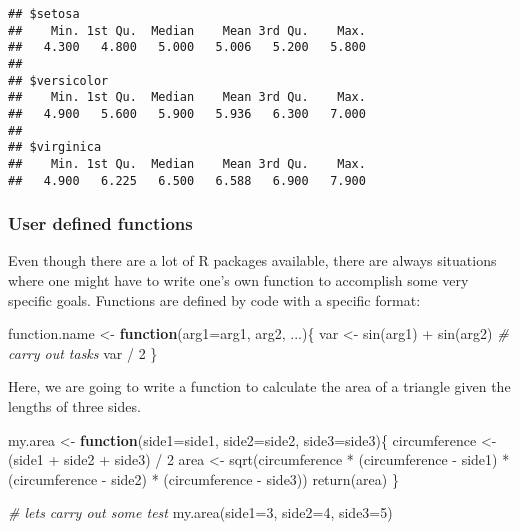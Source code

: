 \documentclass[
]{article}
\newenvironment{Shaded}{\begin{snugshade}}{\end{snugshade}}
\newcommand{\AttributeTok}[1]{\textcolor[rgb]{0.77,0.63,0.00}{#1}}
\newcommand{\CommentTok}[1]{\textcolor[rgb]{0.56,0.35,0.01}{\textit{#1}}}
\newcommand{\ControlFlowTok}[1]{\textcolor[rgb]{0.13,0.29,0.53}{\textbf{#1}}}
\newcommand{\DecValTok}[1]{\textcolor[rgb]{0.00,0.00,0.81}{#1}}
\newcommand{\FunctionTok}[1]{\textcolor[rgb]{0.00,0.00,0.00}{#1}}
\newcommand{\NormalTok}[1]{#1}
\newcommand{\OtherTok}[1]{\textcolor[rgb]{0.56,0.35,0.01}{#1}}
\newcommand{\SpecialCharTok}[1]{\textcolor[rgb]{0.00,0.00,0.00}{#1}}
\begin{document}
\begin{verbatim}
## $setosa
##    Min. 1st Qu.  Median    Mean 3rd Qu.    Max. 
##   4.300   4.800   5.000   5.006   5.200   5.800 
## 
## $versicolor
##    Min. 1st Qu.  Median    Mean 3rd Qu.    Max. 
##   4.900   5.600   5.900   5.936   6.300   7.000 
## 
## $virginica
##    Min. 1st Qu.  Median    Mean 3rd Qu.    Max. 
##   4.900   6.225   6.500   6.588   6.900   7.900
\end{verbatim}

\hypertarget{user-defined-functions}{%
\subsubsection{User defined functions}\label{user-defined-functions}}

Even though there are a lot of R packages available, there are always
situations where one might have to write one's own function to
accomplish some very specific goals. Functions are defined by code with
a specific format:

\begin{Shaded}
\begin{Highlighting}[]
\NormalTok{function.name }\OtherTok{\textless{}{-}} \ControlFlowTok{function}\NormalTok{(}\AttributeTok{arg1=}\NormalTok{arg1, arg2, ...)\{}
\NormalTok{    var }\OtherTok{\textless{}{-}} \FunctionTok{sin}\NormalTok{(arg1) }\SpecialCharTok{+} \FunctionTok{sin}\NormalTok{(arg2)  }\CommentTok{\# carry out tasks}
\NormalTok{    var }\SpecialCharTok{/} \DecValTok{2}
\NormalTok{\}}
\end{Highlighting}
\end{Shaded}

Here, we are going to write a function to calculate the area of a
triangle given the lengths of three sides.

\begin{Shaded}
\begin{Highlighting}[]
\NormalTok{my.area }\OtherTok{\textless{}{-}} \ControlFlowTok{function}\NormalTok{(}\AttributeTok{side1=}\NormalTok{side1, }\AttributeTok{side2=}\NormalTok{side2, }\AttributeTok{side3=}\NormalTok{side3)\{}
\NormalTok{    circumference }\OtherTok{\textless{}{-}}\NormalTok{ (side1 }\SpecialCharTok{+}\NormalTok{ side2 }\SpecialCharTok{+}\NormalTok{ side3) }\SpecialCharTok{/} \DecValTok{2}
\NormalTok{    area }\OtherTok{\textless{}{-}} \FunctionTok{sqrt}\NormalTok{(circumference }\SpecialCharTok{*}\NormalTok{ (circumference }\SpecialCharTok{{-}}\NormalTok{ side1) }\SpecialCharTok{*}\NormalTok{ (circumference }\SpecialCharTok{{-}}\NormalTok{ side2) }\SpecialCharTok{*}\NormalTok{ (circumference }\SpecialCharTok{{-}}\NormalTok{ side3))}
    \FunctionTok{return}\NormalTok{(area)}
\NormalTok{\}}

\CommentTok{\# let\textquotesingle{}s carry out some test}
\FunctionTok{my.area}\NormalTok{(}\AttributeTok{side1=}\DecValTok{3}\NormalTok{, }\AttributeTok{side2=}\DecValTok{4}\NormalTok{, }\AttributeTok{side3=}\DecValTok{5}\NormalTok{)}
\end{Highlighting}
\end{Shaded}
\end{document}
